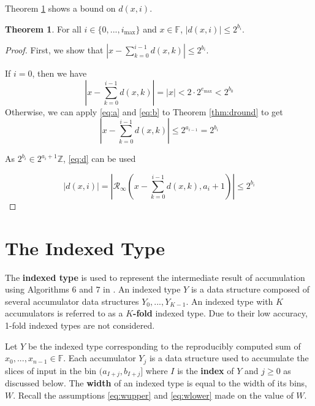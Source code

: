 \documentclass[12pt]{article}
\providecommand{\F}{\ensuremath{\mathbb{F}}}
\providecommand{\Z}{\ensuremath{\mathbb{Z}}}
\providecommand{\max}{\ensuremath{\text{max}}}
\providecommand{\roundtonearestinfty}{\ensuremath{\mathcal{R}_\text{$\infty$}}}
\theoremstyle{definition}
\newtheorem{thm}{Theorem}[section]
\numberwithin{equation}{section}
\numberwithin{figure}{section}
\begin{document}
    Theorem \ref{thm:dbound} shows a bound on $d(x, i)$.

    \begin{samepage}
    \begin{thm}
      For all $i \in \{0, ..., i_{\max}\}$ and $x \in \F$, $|d(x, i)| \leq 2^{b_i}$.
      \label{thm:dbound}
    \end{thm}
    \end{samepage}

    \begin{proof}
      First, we show that $|x - \sum\limits_{k=0}^{i - 1}d(x,k)| \leq 2^{b_i}$.

      If $i = 0$, then we have
      \begin{equation*}
        |x - \sum\limits_{k=0}^{i - 1}d(x,k)| = |x| < 2 \cdot 2^{e_{\max}} < 2^{b_0}
      \end{equation*}
      Otherwise, we can apply  \eqref{eq:a} and \eqref{eq:b} to Theorem \ref{thm:dround} to get
      \begin{equation*}
        |x - \sum \limits_{k = 0}^{i - 1}d(x, k)| \leq 2^{a_{i - 1}} = 2^{b_i}
      \end{equation*}

      As $2^{b_i} \in 2^{a_i + 1}\Z$,  \eqref{eq:d} can be used

      \begin{equation*}
        |d(x, i)| = |\roundtonearestinfty(x - \sum\limits_{k=0}^{i - 1}d(x,k), a_i + 1)| \leq 2^{b_i}
      \end{equation*}
    \end{proof}

\section{The Indexed Type}
  \label{sec:indexed}
    The \textbf{indexed type} is used to represent the intermediate result of accumulation using Algorithms 6 and $7$ in \cite{repsum}.
    An indexed type $Y$ is a data structure composed of several accumulator data structures $Y_0, ..., Y_{K - 1}$. An indexed type with $K$ accumulators is referred to as a \textbf{$K$-fold} indexed type. Due to their low accuracy, 1-fold indexed types are not considered.

    Let $Y$ be the indexed type corresponding to the reproducibly computed sum of $x_0, ..., x_{n - 1} \in \F$.
    Each accumulator $Y_j$ is a data structure used to accumulate the slices of input in the bin $(a_{I + j}, b_{I + j}]$ where $I$ is the \textbf{index} of $Y$ and $j \geq 0$ as discussed below. The \textbf{width} of an indexed type is equal to the width of its bins, $W$. Recall the assumptions \eqref{eq:wupper} and \eqref{eq:wlower} made on the value of $W$.
\end{document}
